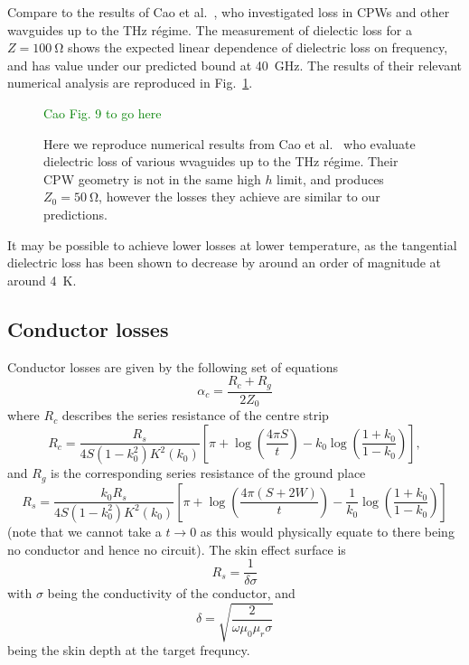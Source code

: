 \documentclass[a4paper]{article}
\newcommand{\ph}[1]{\textcolor{green}{#1}} %
\begin{document}
Compare to the results of  Cao et al.~\cite{L.Cao2013}, who
investigated loss in CPWs and other wavguides up to the \si{\tera\hertz}
r\'egime. The measurement of dielectic loss for a $Z=\SI{100}{\ohm}$ shows the
expected linear dependence of dielectric loss on frequency, and has value under
our predicted bound at \SI{40}{\giga\hertz}. The results of their relevant
numerical analysis are reproduced in Fig.~\ref{fig:CaoFig9}.

\begin{figure}
  \ph{Cao Fig. 9 to go here}
  \caption{Here we reproduce numerical results from Cao et al.~\cite{L.Cao2013}
  who evaluate dielectric loss of various wvaguides up to the \si{\tera\hertz}
  r\'egime. Their CPW geometry is not in the same high $h$ limit, and produces
  $Z_0 = \SI{50}{\ohm}$, however the losses they achieve are similar to our
  predictions.
  }
  \label{fig:CaoFig9}
\end{figure}

It may be possible to achieve lower losses at lower temperature, as the
tangential dielectric loss has been shown to decrease by around an order of
magnitude at around \SI{4}{\kelvin}. \cite{1717770}

\subsection{Conductor losses}

Conductor losses are given by the following set of equations\cite{Simons2004}
\begin{equation}
  \alpha_c = \frac{R_c +R_g}{2Z_0}
\end{equation}
where $R_c$ describes the series resistance of the centre strip
\begin{equation}
  R_c = \frac{R_s}{4 S(1-k_0^2)K^2(k_0)}\left[ \pi + \log\left(\frac{4\pi
  S}{t}\right) - k_0\log\left(\frac{1+k_0}{1-k_0}\right) \right],
\end{equation}
and $R_g$ is the corresponding series resistance of the ground place
\begin{equation}
  R_s = \frac{k_0 R_s}{4S(1-k_0^2)K^2(k_0)}\left[\pi +
  \log\left(\frac{4\pi(S+2W)}{t}\right) -
  \frac{1}{k_0}\log\left(\frac{1+k_0}{1-k_0}\right)\right]
\end{equation}
(note that we cannot take a $t\to 0$ as this would physically equate to there
being no conductor and hence no circuit). The skin effect surface is
\begin{equation}
  R_s = \frac{1}{\delta\sigma}
\end{equation}
with $\sigma$ being the conductivity of the conductor, and
\begin{equation}
  \delta = \sqrt{\frac{2}{\omega\mu_0\mu_r\sigma}}
\end{equation}
being the skin depth at the target frequncy.
\end{document}
